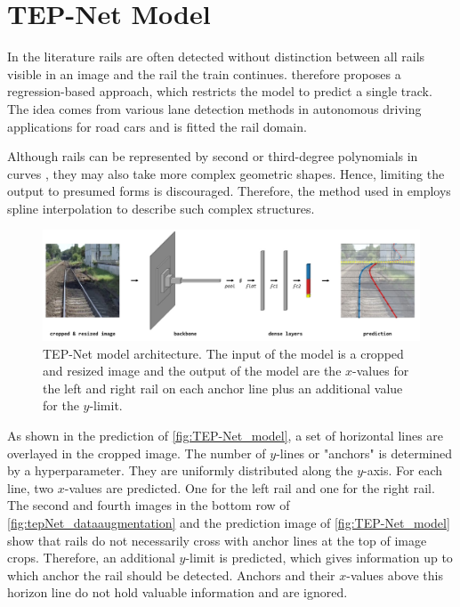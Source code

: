 \section{TEP-Net Model}
\label{sec:baselineModel}

In the literature rails are often detected without distinction between all rails visible in an image and the rail the train continues.
\cite{tepNet2024} therefore proposes a regression-based approach, which restricts the model to predict a single track.
The idea comes from various lane detection methods in autonomous driving applications for road cars and is fitted the rail domain.

Although rails can be represented by second or third-degree polynomials in curves \cite{PolyLaneNetRoad2021}, they may also take more complex geometric shapes.
Hence, limiting the output to presumed forms is discouraged.
Therefore, the method used in \cite{tepNet2024} employs spline interpolation to describe such complex structures.

\begin{figure}[H]
    \centering
    \includegraphics[width=\linewidth]{PICs/Baselinepaper/TEP-Net_model.jpg}
    \caption{\ac{TEP}-Net model architecture\cite{tepNet2024}. The input of the model is a cropped and resized image and the output of the model are the $x$-values for the left and right rail on each anchor line plus an additional value for the $y$-limit.}
    \label{fig:TEP-Net_model}
\end{figure}

As shown in the prediction of \autoref{fig:TEP-Net_model}, a set of horizontal lines are overlayed in the cropped image.
The number of $y$-lines or "anchors" is determined by a hyperparameter.
They are uniformly distributed along the $y$-axis. For each line, two $x$-values are predicted.
One for the left rail and one for the right rail.
The second and fourth images in the bottom row of \autoref{fig:tepNet_dataaugmentation} and the prediction image of \autoref{fig:TEP-Net_model} show that rails do not necessarily cross with anchor lines at the top of image crops.
Therefore, an additional $y$-limit is predicted, which gives information up to which anchor the rail should be detected.
Anchors and their $x$-values above this horizon line do not hold valuable information and are ignored.

